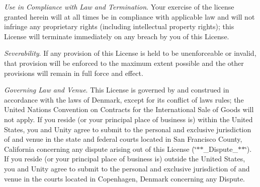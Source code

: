 \begin{DoxyEnumerate}
\item {\itshape Use in Compliance with Law and Termination}. Your exercise of the license granted herein will at all times be in compliance with applicable law and will not infringe any proprietary rights (including intellectual property rights); this License will terminate immediately on any breach by you of this License.
\end{DoxyEnumerate}
\begin{DoxyEnumerate}
\item {\itshape Severability}. If any provision of this License is held to be unenforceable or invalid, that provision will be enforced to the maximum extent possible and the other provisions will remain in full force and effect.
\end{DoxyEnumerate}
\begin{DoxyEnumerate}
\item {\itshape Governing Law and Venue}. This License is governed by and construed in accordance with the laws of Denmark, except for its conflict of laws rules; the United Nations Convention on Contracts for the International Sale of Goods will not apply. If you reside (or your principal place of business is) within the United States, you and Unity agree to submit to the personal and exclusive jurisdiction of and venue in the state and federal courts located in San Francisco County, California concerning any dispute arising out of this License (\char`\"{}$\ast$$\ast$\+\_\+\+Dispute\+\_\+$\ast$$\ast$\char`\"{}). If you reside (or your principal place of business is) outside the United States, you and Unity agree to submit to the personal and exclusive jurisdiction of and venue in the courts located in Copenhagen, Denmark concerning any Dispute. 
\end{DoxyEnumerate}